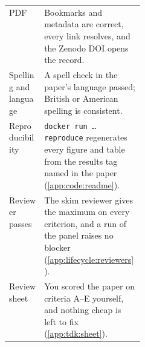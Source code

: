 {\begin{xltabular}{\linewidth}{>{\raggedright\arraybackslash}p{0.26\linewidth} X}
  PDF & Bookmarks and metadata are correct, every link resolves, and the Zenodo DOI opens the record. \\
  Spelling and language & A spell check in the paper's language passed; British or American spelling is consistent. \\
  Reproducibility & \texttt{docker run \dots{} reproduce} regenerates every figure and table from the results tag named in the paper (\cref{app:code:readme}). \\
  Reviewer passes & The skim reviewer gives the maximum on every criterion, and a run of the panel raises no blocker (\cref{app:lifecycle:reviewers}). \\
  Review sheet & You scored the paper on criteria A--E yourself, and nothing cheap is left to fix (\cref{app:tdk:sheet}). \\
\end{xltabular}
}
